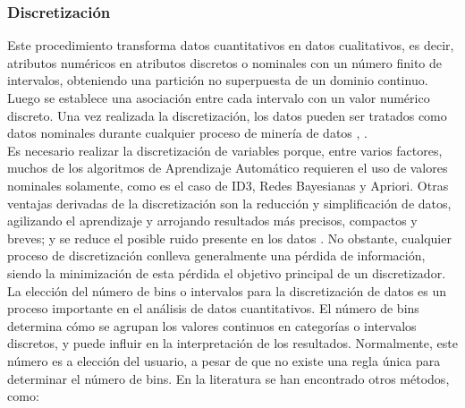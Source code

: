 \subsubsection*{Discretización} \label{sub-epigrafe-disc}
Este procedimiento transforma datos cuantitativos en datos cualitativos, es decir, atributos numéricos en atributos discretos o nominales con un número finito de intervalos, obteniendo una partición no superpuesta de un dominio continuo. Luego se establece una asociación entre cada intervalo con un valor numérico discreto. Una vez realizada la discretización, los datos pueden ser tratados como datos nominales durante cualquier proceso de minería de datos \citep{garcia2015data}, \citep{garcia2012survey}. \\
Es necesario realizar la discretización de variables porque, entre varios factores, muchos de los algoritmos de Aprendizaje Automático requieren el uso de valores nominales solamente, como es el caso de ID3, Redes Bayesianas y Apriori. Otras ventajas derivadas de la discretización son la reducción y simplificación de datos, agilizando el aprendizaje y arrojando resultados más precisos, compactos y breves; y se reduce el posible ruido presente en los datos \citep{garcia2012survey}. No obstante, cualquier proceso de discretización conlleva generalmente una pérdida de información, siendo la minimización de esta pérdida el objetivo principal de un discretizador. \\
La elección del número de bins o intervalos para la discretización de datos es un proceso importante en el análisis de datos cuantitativos. El número de bins determina cómo se agrupan los valores continuos en categorías o intervalos discretos, y puede influir en la interpretación de los resultados. Normalmente, este número es a elección del usuario, a pesar de que no existe una regla única para determinar el número de bins. En la literatura se han encontrado otros métodos, como:

